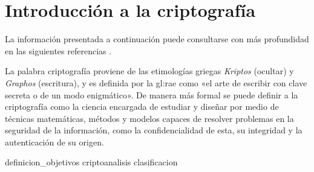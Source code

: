 %
%

\section{Introducción a la criptografía}

La información presentada a continuación puede consultarse con más profundidad
en las siguientes referencias
\cite{menezes, DBLP:series/isc/DelfsK07}.

La palabra criptografía proviene de las etimologías griegas \textit{Kriptos}
(ocultar) y \textit{Graphos} (escritura), y es definida por la \gls{gl:rae}
como «el arte de escribir con clave secreta o de un modo enigmático».
De manera más formal se puede definir a la criptografía como la ciencia
encargada de estudiar y diseñar por medio de técnicas matemáticas, métodos y
modelos capaces de resolver problemas en la seguridad de la información, como
la confidencialidad de esta, su integridad y la autenticación de su origen.

{definicion_objetivos}
{criptoanalisis}
{clasificacion}
